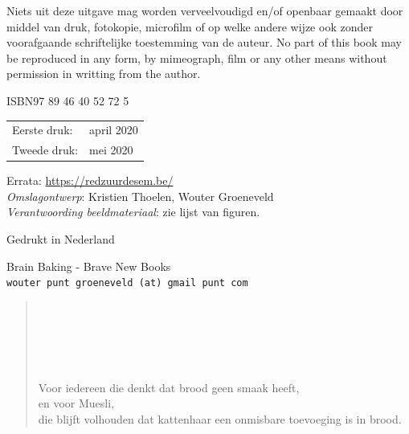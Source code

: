 \documentclass[
  11pt,
  dutch,
]{memoir}
\begin{document}
Niets uit deze uitgave mag worden verveelvoudigd en/of openbaar gemaakt door middel van druk, fotokopie, microfilm of op welke andere wijze ook zonder voorafgaande schriftelijke toestemming van de auteur. \newline
No part of this book may be reproduced in any form, by mimeograph, film or any other means without permission in writting from the author. 

\begin{center}
 ISBN\hspace{2em}97 89 46 40 52 72 5
\end{center}

\begin{center}
\begin{tabular}{ll}
Eerste druk:  & april 2020 \\
Tweede druk:  & mei 2020 \\
\end{tabular}
\end{center}

\vfill

Errata: \url{https://redzuurdesem.be/} \\

\hspace*{2em} \textit{Omslagontwerp}: Kristien Thoelen, Wouter Groeneveld \\
\hspace*{2em} \textit{Verantwoording beeldmateriaal}: zie lijst van figuren. \\

\vfill

Gedrukt in Nederland

Brain Baking - Brave New Books \\
\texttt{wouter punt groeneveld (at) gmail punt com}

\vspace*{2\baselineskip}
\clearpage


 \newenvironment{dedication}
     {\vspace{6ex}\begin{quotation}\begin{center}\begin{em}}
     {\par\end{em}\end{center}\end{quotation}}

\begin{dedication}
  ~\\
  ~\\
  ~\\
  ~\\
  ~\\
	Voor iedereen die denkt dat brood geen smaak heeft, \\
	en voor Muesli, \\
  die blijft volhouden dat kattenhaar een onmisbare toevoeging is in brood. 
\end{dedication}
\end{document}
